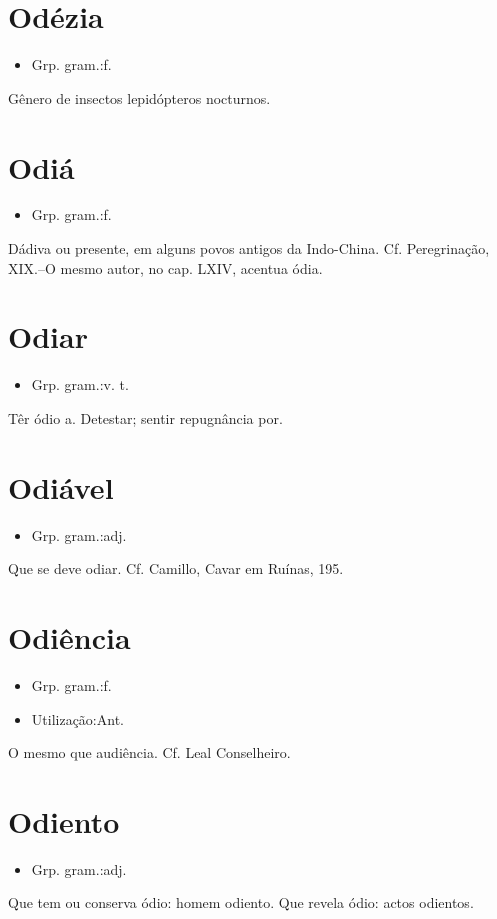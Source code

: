 \section{Odézia}
\begin{itemize}
\item {Grp. gram.:f.}
\end{itemize}
Gênero de insectos lepidópteros nocturnos.
\section{Odiá}
\begin{itemize}
\item {Grp. gram.:f.}
\end{itemize}
Dádiva ou presente, em alguns povos antigos da Indo-China. Cf. \textunderscore Peregrinação\textunderscore , XIX.--O mesmo autor, no cap. LXIV, acentua \textunderscore ódia\textunderscore .
\section{Odiar}
\begin{itemize}
\item {Grp. gram.:v. t.}
\end{itemize}
Têr ódio a.
Detestar; sentir repugnância por.
\section{Odiável}
\begin{itemize}
\item {Grp. gram.:adj.}
\end{itemize}
Que se deve odiar. Cf. Camillo, \textunderscore Cavar em Ruínas\textunderscore , 195.
\section{Odiência}
\begin{itemize}
\item {Grp. gram.:f.}
\end{itemize}
\begin{itemize}
\item {Utilização:Ant.}
\end{itemize}
O mesmo que \textunderscore audiência\textunderscore . Cf. \textunderscore Leal Conselheiro\textunderscore .
\section{Odiento}
\begin{itemize}
\item {Grp. gram.:adj.}
\end{itemize}
Que tem ou conserva ódio: \textunderscore homem odiento\textunderscore .
Que revela ódio: \textunderscore actos odientos\textunderscore .
